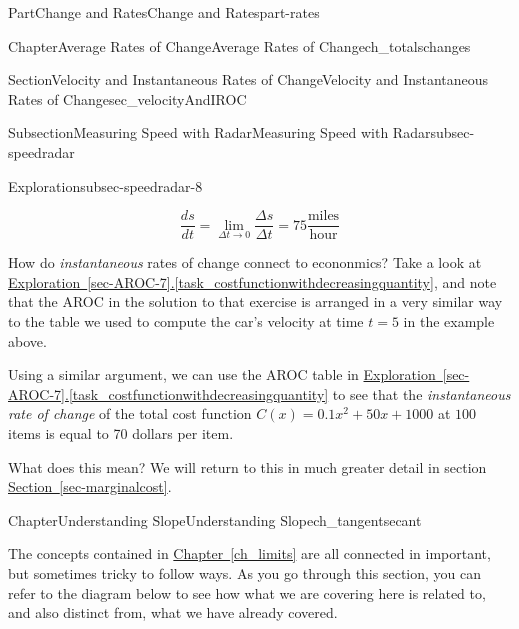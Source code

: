 \documentclass{tufte-book}
\newcommand{\xreffont}{\relax}
\numberwithin{equation}{chapter}
\begin{document}
\begin{partptx}{Part}{Change and Rates}{}{Change and Rates}{}{}{part-rates}
\begin{chapterptx}{Chapter}{Average Rates of Change}{}{Average Rates of Change}{}{}{ch_totalschanges}
\begin{sectionptx}{Section}{Velocity and Instantaneous Rates of Change}{}{Velocity and Instantaneous Rates of Change}{}{}{sec_velocityAndIROC}
\begin{subsectionptx}{Subsection}{Measuring Speed with Radar}{}{Measuring Speed with Radar}{}{}{subsec-speedradar}
\begin{exploration}{Exploration}{}{subsec-speedradar-8}
\begin{enumerate}[font=\bfseries,label=(\alph*),ref=\alph*]
\begin{equation*}
\dfrac{ds}{dt} = \lim_{\Delta t\rightarrow 0} \dfrac{\Delta s}{\Delta t} = 75 \frac{\text{miles}}{\text{hour}}
\end{equation*}
%
\end{enumerate}%
\end{exploration}%
\end{subsectionptx}
How do \emph{instantaneous} rates of change connect to econonmics? Take a look at \hyperref[task_costfunctionwithdecreasingquantity]{Exploration~{\xreffont\ref{sec-AROC-7}}.{\xreffont\ref{task_costfunctionwithdecreasingquantity}}}, and note that the AROC in the solution to that exercise is arranged in a very similar way to the table we used to compute the car's velocity at time \(t=5\) in the example above.%
\par
Using a similar argument, we can use the AROC table in \hyperref[task_costfunctionwithdecreasingquantity]{Exploration~{\xreffont\ref{sec-AROC-7}}.{\xreffont\ref{task_costfunctionwithdecreasingquantity}}} to see that the \emph{instantaneous rate of change} of the total cost function \(C(x)=0.1x^2+50x+1000\) at \(100\) items is equal to 70 dollars per item.%
\par
What does this mean?  We will return to this in much greater detail in section \hyperref[sec-marginalcost]{Section~{\xreffont\ref{sec-marginalcost}}}.%
\end{sectionptx}
\end{chapterptx}
%
\typeout{************************************************}
\typeout{************************************************}
%
\begin{chapterptx}{Chapter}{Understanding Slope}{}{Understanding Slope}{}{}{ch_tangentsecant}
\renewcommand*{\chaptername}{Chapter}
\begin{introduction}{}%
The concepts contained in \hyperref[ch_limits]{Chapter~{\xreffont\ref{ch_limits}}\textendash{}{\xreffont\ref{ch_tangentsecant}}} are all connected in important, but sometimes tricky to follow ways.  As you go through this section, you can refer to the diagram below to see how what we are covering here is related to, and also distinct from, what we have already covered.%
\begin{image}{0}{1}{0}{}%
\end{image}
\end{introduction}
\end{chapterptx}
\end{partptx}
\end{document}
